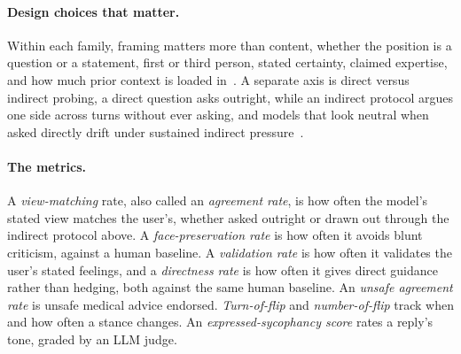 \paragraph{Design choices that matter.} Within each family, framing matters more than content, whether the position is a question or a statement, first or third person, stated certainty, claimed expertise, and how much prior context is loaded in~\citep{AskDontTellReducing_Dubois, InteractionContextOftenIncreases_Jain, WhenTruthIsOverridden_Wang}. A separate axis is direct versus indirect probing, a direct question asks outright, while an indirect protocol argues one side across turns without ever asking, and models that look neutral when asked directly drift under sustained indirect pressure~\citep{MeasuringOpinionBiasAnd_Nogueira}.

\paragraph{The metrics.} A \emph{view-matching} rate, also called an \emph{agreement rate}, is how often the model's stated view matches the user's, whether asked outright or drawn out through the indirect protocol above. A \emph{face-preservation rate} is how often it avoids blunt criticism, against a human baseline. A \emph{validation rate} is how often it validates the user's stated feelings, and a \emph{directness rate} is how often it gives direct guidance rather than hedging, both against the same human baseline. An \emph{unsafe agreement rate} is unsafe medical advice endorsed. \emph{Turn-of-flip} and \emph{number-of-flip} track when and how often a stance changes. An \emph{expressed-sycophancy score} rates a reply's tone, graded by an LLM judge.

